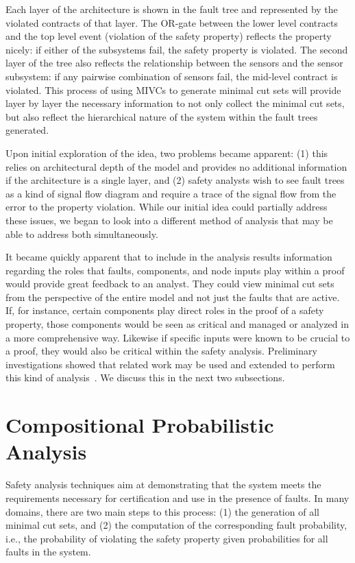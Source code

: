 Each layer of the architecture is shown in the fault tree and represented by the violated contracts of that layer. The OR-gate between the lower level contracts and the top level event (violation of the safety property) reflects the property nicely: if either of the subsystems fail, the safety property is violated. The second layer of the tree also reflects the relationship between the sensors and the sensor subsystem: if any pairwise combination of sensors fail, the mid-level contract is violated. This process of using MIVCs to generate minimal cut sets will provide layer by layer the necessary information to not only collect the minimal cut sets, but also reflect the hierarchical nature of the system within the fault trees generated.

Upon initial exploration of the idea, two problems became apparent: (1) this relies on architectural depth of the model and provides no additional information if the architecture is a single layer, and (2) safety analysts wish to see fault trees as a kind of signal flow diagram and require a trace of the signal flow from the error to the property violation. While our initial idea could partially address these issues, we began to look into a different method of analysis that may be able to address both simultaneously. 

It became quickly apparent that to include in the analysis results information regarding the roles that faults, components, and node inputs play within a proof would provide great feedback to an analyst. They could view minimal cut sets from the perspective of the entire model and not just the faults that are active. If, for instance, certain components play direct roles in the proof of a safety property, those components would be seen as critical and managed or analyzed in a more comprehensive way. Likewise if specific inputs were known to be crucial to a proof, they would also be critical within the safety analysis. Preliminary investigations showed that related work may be used and extended to perform this kind of analysis~\cite{9081652}. We discuss this in the next two subsections.





\section{Compositional Probabilistic Analysis}
Safety analysis techniques aim at demonstrating that the system meets the requirements necessary for certification and use in the presence of faults. In many domains, there are two main steps to this process: (1) the generation of all minimal cut sets, and (2) the computation of the corresponding fault probability, i.e., the probability of violating the safety property given probabilities for all faults in the system. 

